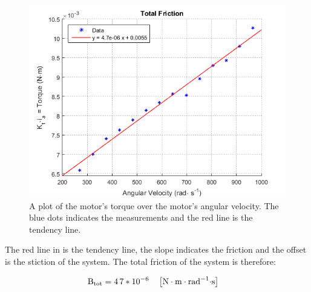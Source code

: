\begin{figure}[H]
  \centering
	\includegraphics[scale=1]{figures/FrictionTestPlot.png}
	\caption{A plot of the motor's torque over the motor's angular velocity. The blue dots indicates the measurements and the red line is the tendency line.}
	\label{TotalFriction}
\end{figure}

The red line in  is the tendency line, the slope indicates the friction and the offset is the stiction of the system. The total friction of the system is therefore:

\begin{align}
\eq{B_{tot}}{4.7*10^{-6}} \unit{N \cdot m \cdot rad^{-1} \cdot s}
\end{align}